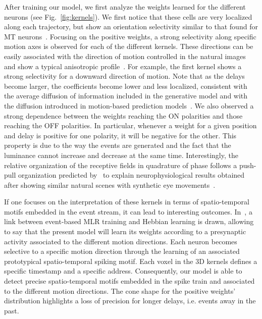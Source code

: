 \documentclass[default]{sn-jnl}%
\theoremstyle{thmstyleone}%
\theoremstyle{thmstyletwo}%
\theoremstyle{thmstylethree}%
\newcommand{\seeFig}[1]{see Fig.~\ref{fig:#1}}%
\begin{document}
%
%
After training our model, we first analyze the weights learned for the different neurons (\seeFig{kernels}). We first notice that these cells are very localized along each trajectory, but show an orientation selectivity similar to that found for MT neurons~\citep{deangelis_functional_1999}. Focusing on the positive weights, a strong selectivity along specific motion axes is observed for each of the different kernels. These directions can be easily associated with the direction of motion controlled in the natural images and show a typical anisotropic profile~\citep{kaplan_anisotropic_2013}. For example, the first kernel shows a strong selectivity for a downward direction of motion. Note that as the delays become larger, the coefficients become lower and less localized, consistent with the average diffusion of information included in the generative model and with the diffusion introduced in motion-based prediction models~\citep{perrinet_motion-based_2012,khoei_flash-lag_2017}. We also observed a strong dependence between the weights reaching the ON polarities and those reaching the OFF polarities. In particular, whenever a weight for a given position and delay is positive for one polarity, it will be negative for the other. This property is due to the way the events are generated and the fact that the luminance cannot increase and decrease at the same time.  Interestingly, the relative organization of the receptive fields in quadrature of phase follows a push-pull organization predicted by~\citet{kremkow_push-pull_2016} to explain neurophysiological results obtained after showing similar natural scenes with synthetic eye movements~\citep{baudot_animation_2013}.

If one focuses on the interpretation of these kernels in terms of spatio-temporal motifs embedded in the event stream, it can lead to interesting outcomes. In~\citep{grimaldi_robust_2022}, a link between event-based MLR training and Hebbian learning is drawn, allowing to say that the present model will learn its weights according to a presynaptic activity associated to the different motion directions. Each neuron becomes selective to a specific motion direction through the learning of an associated prototypical spatio-temporal spiking motif. Each voxel in the 3D kernels defines a specific timestamp and a specific address. Consequently, our model is able to detect precise spatio-temporal motifs embedded in the spike train and associated to the different motion directions. The cone shape for the positive weights' distribution highlights a loss of precision for longer delays, i.e. events away in the past. %
\end{document}
